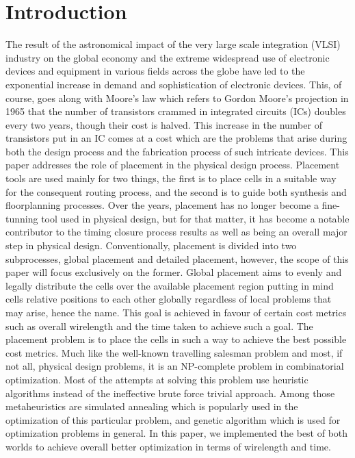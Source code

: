 \documentclass[conference]{IEEEtran}
\begin{document}
\section{Introduction}

The result of the astronomical impact of the very large scale integration (VLSI) industry on the global economy and the extreme widespread use of electronic devices and equipment in various fields across the globe have led to the exponential increase in demand and sophistication of electronic devices. This, of course, goes along with Moore's law which refers to Gordon Moore's projection in 1965 that the number of transistors crammed in integrated circuits (ICs) doubles every two years, though their cost is halved. This increase in the number of transistors put in an IC comes at a cost which are the problems that arise during both the design process and the fabrication process of such intricate devices. This paper addresses the role of placement in the physical design process. Placement tools are used mainly for two things, the first is to place cells in a suitable way for the consequent routing process, and the second is to guide both synthesis and floorplanning processes. Over the years, placement has no longer become a fine-tunning tool used in physical design, but for that matter, it has become a notable contributor to the timing closure process results as well as being an overall major step in physical design. Conventionally, placement is divided into two subprocesses, global placement and detailed placement, however, the scope of this paper will focus exclusively on the former. Global placement aims to evenly and legally distribute the cells over the available placement region putting in mind cells relative positions to each other globally regardless of local problems that may arise, hence the name. This goal is achieved in favour of certain cost metrics such as overall wirelength and the time taken to achieve such a goal. The placement problem is to place the cells in such a way to achieve the best possible cost metrics. Much like the well-known travelling salesman problem and most, if not all, physical design problems, it is an NP-complete problem in combinatorial optimization. Most of the attempts at solving this problem use heuristic algorithms instead of the ineffective brute force trivial approach. Among those metaheuristics are simulated annealing which is popularly used in the optimization of this particular problem, and genetic algorithm which is used for optimization problems in general. In this paper, we implemented the best of both worlds to achieve overall better optimization in terms of wirelength and time.
\end{document}
